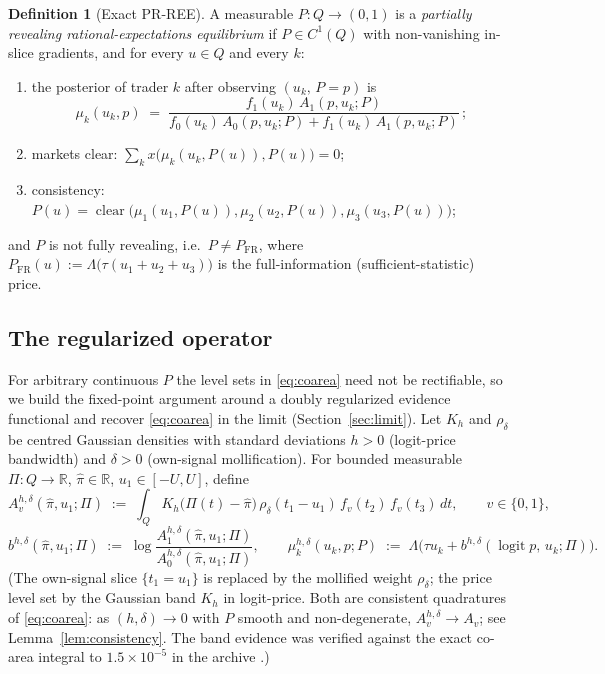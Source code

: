 \documentclass[11pt]{article}
\theoremstyle{definition}
\newtheorem{definition}{Definition}
\newcommand{\R}{\mathbb{R}}
\newcommand{\Lam}{\Lambda}
\newcommand{\clear}{\operatorname{clear}}
\begin{document}
\begin{definition}[Exact PR-REE]\label{def:exact}
A measurable $P:Q\to(0,1)$ is a \emph{partially revealing
rational-expectations equilibrium} if $P\in C^1(Q)$ with non-vanishing
in-slice gradients, and for every $u\in Q$ and every $k$:
\begin{enumerate}[(1)]
\item the posterior of trader $k$ after observing $(u_k,\,P=p)$ is
\[
\mu_k(u_k,p)\;=\;
\frac{f_1(u_k)\,A_1(p,u_k;P)}{f_0(u_k)\,A_0(p,u_k;P)+f_1(u_k)\,A_1(p,u_k;P)}\,;
\]
\item markets clear: $\sum_{k}x\big(\mu_k(u_k,P(u)),P(u)\big)=0$;
\item consistency: $P(u)=\clear\big(\mu_1(u_1,P(u)),\mu_2(u_2,P(u)),
\mu_3(u_3,P(u))\big)$;
\end{enumerate}
and $P$ is not fully revealing, i.e.\ $P\neq P_{\mathrm{FR}}$, where
$P_{\mathrm{FR}}(u):=\Lam\big(\tau(u_1+u_2+u_3)\big)$ is the
full-information (sufficient-statistic) price.
\end{definition}

\subsection{The regularized operator}
For arbitrary continuous $P$ the level sets in \eqref{eq:coarea} need not be
rectifiable, so we build the fixed-point argument around a doubly
regularized evidence functional and recover \eqref{eq:coarea} in the limit
(Section~\ref{sec:limit}). Let $K_h$ and $\rho_\delta$ be centred Gaussian
densities with standard deviations $h>0$ (logit-price bandwidth) and
$\delta>0$ (own-signal mollification). For bounded measurable
$\Pi:Q\to\R$, $\hat\pi\in\R$, $u_1\in[-U,U]$, define
\begin{equation}\label{eq:Areg}
A^{h,\delta}_v(\hat\pi,u_1;\Pi)\;:=\;
\int_{Q}K_h\big(\Pi(t)-\hat\pi\big)\,\rho_\delta(t_1-u_1)\,
f_v(t_2)\,f_v(t_3)\,dt,
\qquad v\in\{0,1\},
\end{equation}
\begin{equation}\label{eq:b}
b^{h,\delta}(\hat\pi,u_1;\Pi)\;:=\;
\log\frac{A^{h,\delta}_1(\hat\pi,u_1;\Pi)}{A^{h,\delta}_0(\hat\pi,u_1;\Pi)},
\qquad
\mu^{h,\delta}_k(u_k,p;P)\;:=\;
\Lam\big(\tau u_k+b^{h,\delta}(\operatorname{logit}p,\,u_k;\Pi)\big).
\end{equation}
(The own-signal slice $\{t_1=u_1\}$ is replaced by the mollified weight
$\rho_\delta$; the price level set by the Gaussian band $K_h$ in logit-price.
Both are consistent quadratures of \eqref{eq:coarea}: as
$(h,\delta)\to0$ with $P$ smooth and non-degenerate,
$A^{h,\delta}_v\to A_v$; see Lemma~\ref{lem:consistency}. The band evidence
was verified against the exact co-area integral to $1.5\times10^{-5}$ in the
archive \cite{REZN}.)
\end{document}
